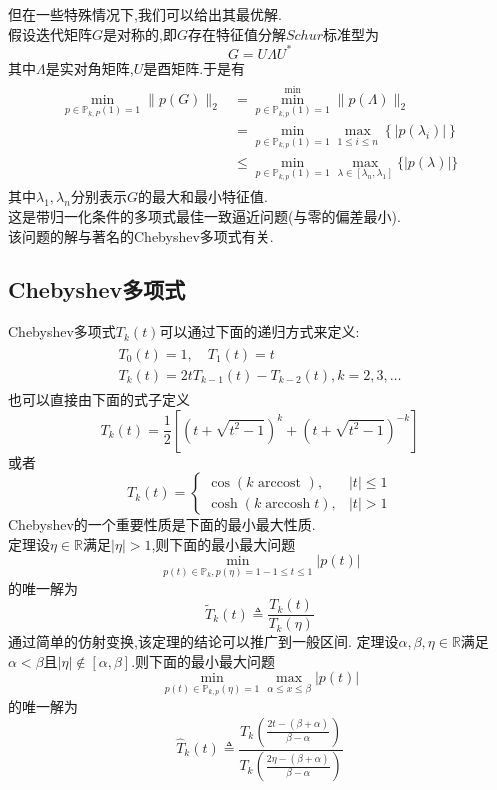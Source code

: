 \documentclass[12pt,a4paper]{article}
\begin{document}
但在一些特殊情况下,我们可以给出其最优解.\\
假设迭代矩阵$G$是对称的,即$G$存在特征值分解$Schur$标准型为
$$
G=U \Lambda U^{*}
$$
其中$\Lambda$是实对角矩阵,$U$是酉矩阵.于是有
\begin{align*}
\begin{array}{ll}
	\min _{p \in \mathbb{P}_{k, P}(1)=1}\|p(G)\|_{2}&{=\min _{p \in \mathbb{P}_{k, p}(1)=1}^{\min }\|p(\Lambda)\|_{2}} \\ {}&{=\min _{p \in \mathbb{P}_{k, p}(1)=1} \max _{1 \leq i \leq n}\left\{\left|p\left(\lambda_{i}\right)\right|\right\}} \\ {}&{ \leq \min _{p \in \mathbb{P}_{k, p}(1)=1} \max _{\lambda \in\left[\lambda_{n}, \lambda_{1}\right]}\{|p(\lambda)|\}}\end{array}
\tag{6.22}
\end{align*}
其中$\lambda_{1}, \lambda_{n}$分别表示$G$的最大和最小特征值.\\
这是带归一化条件的多项式最佳一致逼近问题(与零的偏差最小).\\
该问题的解与著名的{\color{blue}Chebyshev多项式}有关.\\
\subsection*{Chebyshev多项式}
Chebyshev多项式$T_{k}(t)$可以通过下面的递归方式来定义:
\begin{align*}
\begin{array}{l}{T_{0}(t)=1, \quad T_{1}(t)=t} \\ {T_{k}(t)=2 t T_{k-1}(t)-T_{k-2}(t), k=2,3, \ldots}\end{array}
\tag{6.23}
\end{align*}
也可以直接由下面的式子定义
$$
T_{k}(t)=\frac{1}{2}\left[\left(t+\sqrt{t^{2}-1}\right)^{k}+\left(t+\sqrt{t^{2}-1}\right)^{-k}\right]
$$
或者
$$
T_{k}(t)=\left\{\begin{array}{ll}{\cos (k \text { arccost }),} & {|t| \leq 1} \\ {\cosh (k \operatorname{arccosh} t),} & {|t|>1}\end{array}\right.
$$
Chebyshev的一个重要性质是下面的最小最大性质.\\
{\color{blue}定理}设$\eta \in \mathbb{R}$满足$|\eta|>1$,则下面的最小最大问题
$$
\min _{p(t) \in \mathbb{P}_{k}, p(\eta)=1-1 \leq t \leq 1}|p(t)|
$$
的唯一解为
$$
\tilde{T}_{k}(t) \triangleq \frac{T_{k}(t)}{T_{k}(\eta)}
$$
通过简单的仿射变换,该定理的结论可以推广到一般区间.
{\color{blue}定理}\qquad 设$\alpha, \beta, \eta \in \mathbb{R}$满足$\alpha<\beta$且$|\eta| \notin[\alpha, \beta]$.则下面的最小最大问题
$$
\min _{p(t) \in \mathbb{P}_{k, p}(\eta)=1} \max _{\alpha \leq x \leq \beta}|p(t)|
$$
的唯一解为
$$
\hat{T}_{k}(t) \triangleq \frac{T_{k}\left(\frac{2 t-(\beta+\alpha)}{\beta-\alpha}\right)}{T_{k}\left(\frac{2 \eta-(\beta+\alpha)}{\beta-\alpha}\right)}
$$
\end{document}
